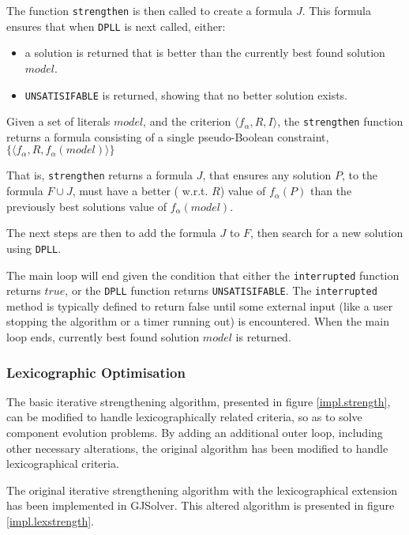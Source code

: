 The function \texttt{strengthen} is then called to create a formula $J$.
This formula ensures that when \texttt{DPLL} is next called, either:
\begin{itemize}
  \item a solution is returned that is better than the currently best found solution $model$. 
  \item \texttt{UNSATISIFABLE} is returned, showing that no better solution exists.
\end{itemize}

\begin{defs}
Given a set of literals $model$, and the criterion $\langle f_{\alpha}, R, I \rangle$,
the \texttt{strengthen} function returns a formula consisting of a single pseudo-Boolean constraint, $\{ \langle f_{\alpha},R,f_{\alpha}(model) \rangle \}$
\end{defs}
That is, \texttt{strengthen} returns a formula $J$,
that ensures any solution $P$, to the formula $F \cup J$, must have a better ( w.r.t. $R$) value of $f_{\alpha}(P)$ than the previously best solutions value of $f_{\alpha}(model)$.

The next steps are then to add the formula $J$ to $F$, then search for a new solution using \texttt{DPLL}.

The main loop will end given the condition that either the \texttt{interrupted} function returns $true$, or the \texttt{DPLL} function returns \texttt{UNSATISIFABLE}.
The \texttt{interrupted} method is typically defined to return false until some external input (like a user stopping the algorithm or a timer running out) is encountered.
When the main loop ends, currently best found solution $model$ is returned.

\subsubsection{Lexicographic Optimisation}
The basic iterative strengthening algorithm, presented in figure \ref{impl.strength}, can be modified to handle lexicographically related criteria, so as to solve component evolution problems.
By adding an additional outer loop, including other necessary alterations, the original algorithm has been modified to handle lexicographical criteria.

The original iterative strengthening algorithm with the lexicographical extension has been implemented in GJSolver. 
This altered algorithm is presented in figure \ref{impl.lexstrength}.


